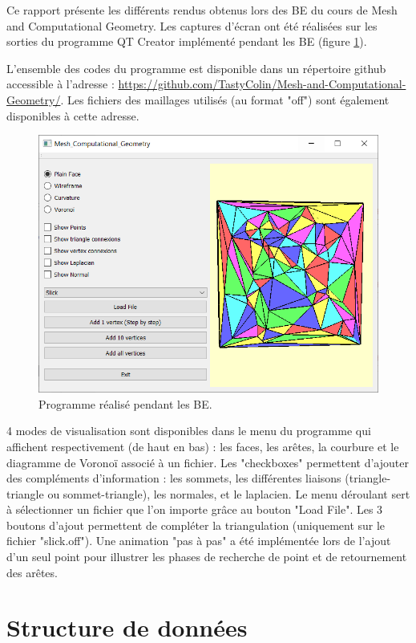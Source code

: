 \documentclass[12pt,a4paper,twoside]{report}
\begin{document}
Ce rapport présente les différents rendus obtenus lors des BE du cours de Mesh and Computational Geometry. Les captures d'écran ont été réalisées sur les sorties du programme QT Creator implémenté pendant les BE (figure \ref{fig:programme}).

L'ensemble des codes du programme est disponible dans un répertoire github accessible à l'adresse : \url{https://github.com/TastyColin/Mesh-and-Computational-Geometry/}. Les fichiers des maillages utilisés (au format "off") sont également disponibles à cette adresse.

\begin{figure}[H]
	\centering
	\includegraphics[scale=0.7]{programme.png}
	\caption{Programme réalisé pendant les BE.}
	\label{fig:programme}
\end{figure}

4 modes de visualisation sont disponibles dans le menu du programme qui affichent respectivement (de haut en bas) : les faces, les arêtes, la courbure et le diagramme de Voronoï associé à un fichier. Les "checkboxes" permettent d'ajouter des compléments d'information : les sommets, les différentes liaisons (triangle-triangle ou sommet-triangle), les normales, et le laplacien. Le menu déroulant sert à sélectionner un fichier que l'on importe grâce au bouton "Load File". Les 3 boutons d'ajout permettent de compléter la triangulation (uniquement sur le fichier "slick.off"). Une animation "pas à pas" a été implémentée lors de l'ajout d'un seul point pour illustrer les phases de recherche de point et de retournement des arêtes.

\newpage \section{Structure de données}
\end{document}
